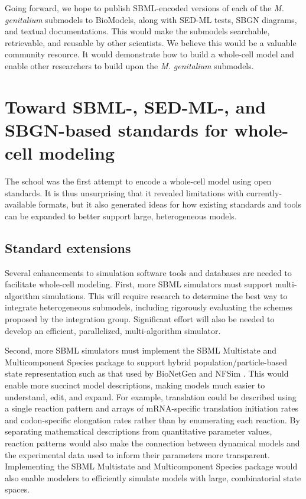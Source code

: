 \documentclass[journal,transmag]{IEEEtran}
\begin{document}
Going forward, we hope to publish SBML-encoded versions of each of the \textit{M. genitalium} submodels to BioModels, along with SED-ML tests, SBGN diagrams, and textual documentations. This would make the submodels searchable, retrievable, and reusable by other scientists. We believe this would be a valuable community resource. It would demonstrate how to build a whole-cell model and enable other researchers to build upon the \textit{M. genitalium} submodels.

\section{Toward SBML-, SED-ML-, and SBGN-based standards for whole-cell modeling}
The school was the first attempt to encode a whole-cell model using open standards. It is thus unsurprising that it revealed limitations with currently-available formats, but it also generated ideas for how existing standards and tools can be expanded to better support large, heterogeneous models.

\subsection{Standard extensions}
Several enhancements to simulation software tools and databases are needed to facilitate whole-cell modeling. First, more SBML simulators must support multi-algorithm simulations. This will require research to determine the best way to integrate heterogeneous submodels, including rigorously evaluating the schemes proposed by the integration group. Significant effort will also be needed to develop an efficient, parallelized, multi-algorithm simulator.

Second, more SBML simulators must implement the SBML Multistate and Multicomponent Species package to support hybrid population/particle-based state representation such as that used by BioNetGen \cite{Hlavacek2006, Hogg2014} and NFSim \cite{Sneddon2011}. This would enable more succinct model descriptions, making models much easier to understand, edit, and expand. For example, translation could be described using a single reaction pattern and arrays of mRNA-specific translation initiation rates and codon-specific elongation rates rather than by enumerating each reaction. By separating mathematical descriptions from quantitative parameter values, reaction patterns would also make the connection between dynamical models and the experimental data used to inform their parameters more transparent. Implementing the SBML Multistate and Multicomponent Species package would also enable modelers to efficiently simulate models with large, combinatorial state spaces.
\end{document}
